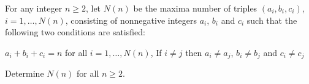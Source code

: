 For any integer $n\geq 2$,  let $N(n)$ be the maxima number of triples $(a_i, b_i, c_i)$,  $i=1, \ldots, N(n)$,  consisting of nonnegative integers $a_i$,  $b_i$ and $c_i$ such  that the following two conditions are satisfied:

$a_i+b_i+c_i=n$ for all $i=1, \ldots, N(n)$, If $i\neq j$ then $a_i\neq a_j$,  $b_i\neq b_j$ and $c_i\neq c_j$

Determine $N(n)$ for all $n\geq 2$.